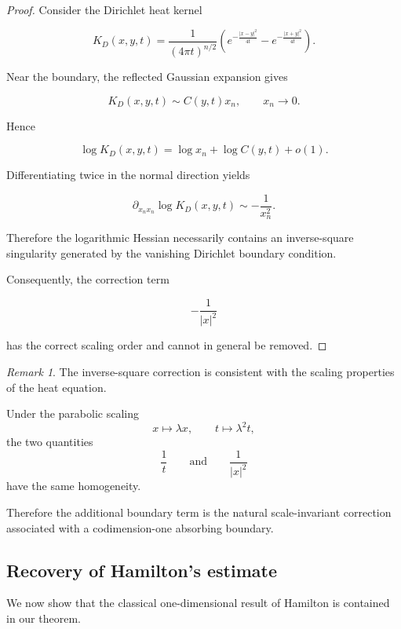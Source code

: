 \documentclass[11pt]{amsart}
\theoremstyle{definition}
\theoremstyle{remark}
\newtheorem{remark}[theorem]{Remark}
\begin{document}
\begin{proof}

Consider the Dirichlet heat kernel

\[
K_D(x,y,t)
=
\frac1{(4\pi t)^{n/2}}
\left(
e^{-\frac{|x-y|^2}{4t}}
-
e^{-\frac{|x+y|^2}{4t}}
\right).
\]


Near the boundary, the reflected Gaussian expansion gives

\[
K_D(x,y,t)
\sim
C(y,t)x_n ,
\qquad x_n\rightarrow0 .
\]

Hence

\[
\log K_D(x,y,t)
=
\log x_n+\log C(y,t)+o(1).
\]

Differentiating twice in the normal direction yields

\[
\partial_{x_nx_n}
\log K_D(x,y,t)
\sim
-\frac1{x_n^2}.
\]

Therefore the logarithmic Hessian necessarily contains an
inverse-square singularity generated by the vanishing Dirichlet
boundary condition.

Consequently, the correction term

\[
-\frac1{|x|^2}
\]

has the correct scaling order and cannot in general be removed.

\end{proof}




\begin{remark}

The inverse-square correction is consistent with the scaling
properties of the heat equation.

Under the parabolic scaling
\[
x\mapsto \lambda x,
\qquad
t\mapsto \lambda^2t ,
\]
the two quantities
\[
\frac1t
\qquad\text{and}\qquad
\frac1{|x|^2}
\]
have the same homogeneity.

Therefore the additional boundary term is the natural
scale-invariant correction associated with a codimension-one
absorbing boundary.

\end{remark}



\subsection{Recovery of Hamilton's estimate}


We now show that the classical one-dimensional result of Hamilton is
contained in our theorem.
\end{document}

